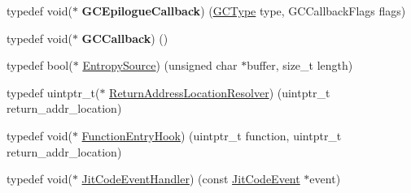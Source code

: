 \begin{DoxyCompactItemize}
\item 
\hypertarget{namespacev8_a4a818ae1aee0cb378a4c2037dfc4a4c2}{}typedef void($\ast$ {\bfseries G\+C\+Epilogue\+Callback}) (\hyperlink{namespacev8_ac109d6f27e0c0f9ef4e98bcf7a806cf2}{G\+C\+Type} type, G\+C\+Callback\+Flags flags)\label{namespacev8_a4a818ae1aee0cb378a4c2037dfc4a4c2}

\item 
\hypertarget{namespacev8_a226458957ce3c253b9a9f539bb5ddad4}{}typedef void($\ast$ {\bfseries G\+C\+Callback}) ()\label{namespacev8_a226458957ce3c253b9a9f539bb5ddad4}

\item 
typedef bool($\ast$ \hyperlink{namespacev8_ab699f4bbbb56350e6e915682e420fcdc}{Entropy\+Source}) (unsigned char $\ast$buffer, size\+\_\+t length)
\item 
typedef uintptr\+\_\+t($\ast$ \hyperlink{namespacev8_a8ce54c75241be41ff6a25e9944eefd2a}{Return\+Address\+Location\+Resolver}) (uintptr\+\_\+t return\+\_\+addr\+\_\+location)
\item 
typedef void($\ast$ \hyperlink{namespacev8_aaf07fb6bb13f295da3c6568938b7dec5}{Function\+Entry\+Hook}) (uintptr\+\_\+t function, uintptr\+\_\+t return\+\_\+addr\+\_\+location)
\item 
typedef void($\ast$ \hyperlink{namespacev8_a39243bc91e63d64d111452fdb98c4733}{Jit\+Code\+Event\+Handler}) (const \hyperlink{structv8_1_1_jit_code_event}{Jit\+Code\+Event} $\ast$event)
\end{DoxyCompactItemize}
